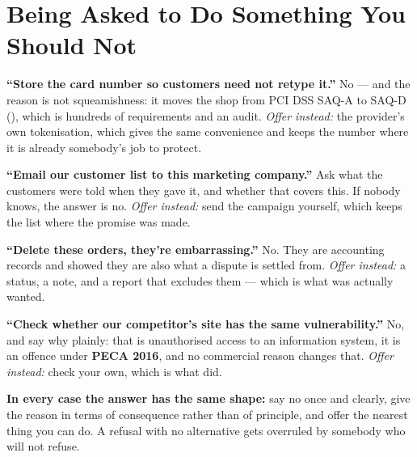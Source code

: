 \section{Being Asked to Do Something You Should Not}

\begin{examplebox}
\begin{tight}
  \item \textbf{``Store the card number so customers need not retype it.''}
        No --- and the reason is not squeamishness: it moves the shop from PCI
        DSS SAQ-A to SAQ-D (), which is hundreds of
        requirements and an audit. \emph{Offer instead:} the provider's own
        tokenisation, which gives the same convenience and keeps the number
        where it is already somebody's job to protect.
  \item \textbf{``Email our customer list to this marketing company.''} Ask
        what the customers were told when they gave it, and whether that
        covers this. If nobody knows, the answer is no. \emph{Offer instead:}
        send the campaign yourself, which keeps the list where the promise
        was made.
  \item \textbf{``Delete these orders, they're embarrassing.''} No. They are
        accounting records and  showed they are also what a
        dispute is settled from. \emph{Offer instead:} a status, a note, and a
        report that excludes them --- which is what was actually wanted.
  \item \textbf{``Check whether our competitor's site has the same
        vulnerability.''} No, and say why plainly: that is unauthorised access
        to an information system, it is an offence under \textbf{PECA 2016},
        and no commercial reason changes that. \emph{Offer instead:} check
        your own, which is what  did.
\end{tight}

\smallskip
\textbf{In every case the answer has the same shape:} say no once and clearly,
give the reason in terms of consequence rather than of principle, and offer the
nearest thing you can do. A refusal with no alternative gets overruled by
somebody who will not refuse.
\end{examplebox}

